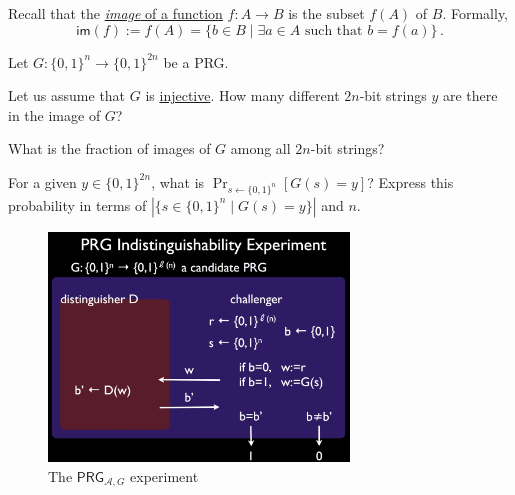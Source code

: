 \documentclass[a4paper,10pt,landscape,twocolumn]{scrartcl}
\begin{document}
\begin{exercise}
Recall that the \href{https://en.wikipedia.org/wiki/Image_(mathematics)}{\emph{image} of a function} $f:A \rightarrow B$ is the subset $f(A)$ of $B$. Formally, 
\[ \mathsf{im}(f) := f(A) = \{b \in B \mid \exists a \in A \mbox{ such that } b=f(a) \} \, .
\]

Let $G:\{0,1\}^n \rightarrow \{0,1\}^{2n}$ be a PRG. 

\begin{subex}
Let us assume that $G$ is \href{https://en.wikipedia.org/wiki/Injective_function}{injective}. How many different $2n$-bit strings $y$ are there in the image of $G$?
\end{subex}

\begin{subex}
What is the fraction of images of $G$ among all $2n$-bit strings?
\end{subex}

\begin{subex}
For a given $y \in \{0,1\}^{2n}$, what is $\Pr_{s \leftarrow
  \{0,1\}^n}[G(s) = y]$? Express this probability in terms of $|\{s \in \{0,1\}^n \mid G(s)=y\} |$ and $n$.
\end{subex}

\end{exercise}

\begin{figure}[h]
\center
\includegraphics[width=8cm]{PRGExperiment.jpg}
\caption{The $\mathsf{PRG}_{\mathcal{A},G}$ experiment \label{fig}}
\end{figure}
\end{document}

